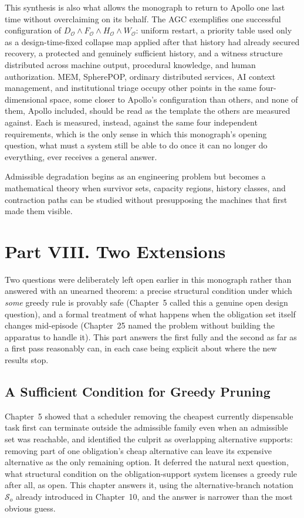 \documentclass[11pt]{report}
\begin{document}
This synthesis is also what allows the monograph to return to Apollo one last time without overclaiming on its behalf. The AGC exemplifies one successful configuration of $D_{\mathcal O} \land F_{\mathcal O} \land H_{\mathcal O} \land W_{\mathcal O}$: uniform restart, a priority table used only as a design-time-fixed collapse map applied after that history had already secured recovery, a protected and genuinely sufficient history, and a witness structure distributed across machine output, procedural knowledge, and human authorization. MEM, SpherePOP, ordinary distributed services, AI context management, and institutional triage occupy other points in the same four-dimensional space, some closer to Apollo's configuration than others, and none of them, Apollo included, should be read as the template the others are measured against. Each is measured, instead, against the same four independent requirements, which is the only sense in which this monograph's opening question, what must a system still be able to do once it can no longer do everything, ever receives a general answer.

Admissible degradation begins as an engineering problem but becomes a mathematical theory when survivor sets, capacity regions, history classes, and contraction paths can be studied without presupposing the machines that first made them visible.

\part*{Part VIII. Two Extensions}

Two questions were deliberately left open earlier in this monograph rather than answered with an unearned theorem: a precise structural condition under which \emph{some} greedy rule is provably safe (Chapter~5 called this a genuine open design question), and a formal treatment of what happens when the obligation set itself changes mid-episode (Chapter~25 named the problem without building the apparatus to handle it). This part answers the first fully and the second as far as a first pass reasonably can, in each case being explicit about where the new results stop.

\chapter{A Sufficient Condition for Greedy Pruning}

Chapter~5 showed that a scheduler removing the cheapest currently dispensable task first can terminate outside the admissible family even when an admissible set was reachable, and identified the culprit as overlapping alternative supports: removing part of one obligation's cheap alternative can leave its expensive alternative as the only remaining option. It deferred the natural next question, what structural condition on the obligation-support system licenses a greedy rule after all, as open. This chapter answers it, using the alternative-branch notation $\mathcal S_o$ already introduced in Chapter~10, and the answer is narrower than the most obvious guess.
\end{document}
